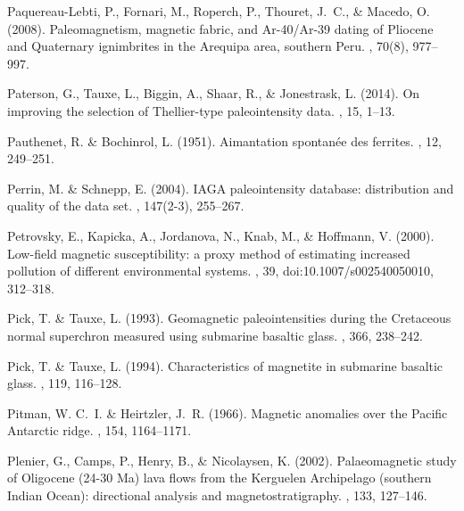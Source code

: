 Paquereau-Lebti, P., Fornari, M., Roperch, P., Thouret, J.~C., \& Macedo, O.
  (2008).
\newblock Paleomagnetism, magnetic fabric, and Ar-40/Ar-39 dating of Pliocene
  and Quaternary ignimbrites in the Arequipa area, southern Peru.
, 70(8), 977--997.

Paterson, G., Tauxe, L., Biggin, A., Shaar, R., \& Jonestrask, L. (2014).
\newblock On improving the selection of Thellier-type paleointensity data.
, 15, 1--13.

Pauthenet, R. \& Bochinrol, L. (1951).
\newblock Aimantation spontan\'ee des ferrites.
, 12, 249--251.

Perrin, M. \& Schnepp, E. (2004).
\newblock IAGA paleointensity database: distribution and quality of the data
  set.
, 147(2-3), 255--267.

Petrovsky, E., Kapicka, A., Jordanova, N., Knab, M., \& Hoffmann, V. (2000).
\newblock Low-field magnetic susceptibility: a proxy method of estimating
  increased pollution of different environmental systems.
, 39, doi:10.1007/s002540050010, 312--318.

Pick, T. \& Tauxe, L. (1993).
\newblock Geomagnetic paleointensities during the Cretaceous normal superchron
  measured using submarine basaltic glass.
, 366, 238--242.

Pick, T. \& Tauxe, L. (1994).
\newblock Characteristics of magnetite in submarine basaltic glass.
, 119, 116--128.

Pitman, W. C.~I. \& Heirtzler, J.~R. (1966).
\newblock Magnetic anomalies over the Pacific Antarctic ridge.
, 154, 1164--1171.

Plenier, G., Camps, P., Henry, B., \& Nicolaysen, K. (2002).
\newblock Palaeomagnetic study of Oligocene (24-30 Ma) lava flows from the
  Kerguelen Archipelago (southern Indian Ocean): directional analysis and
  magnetostratigraphy.
, 133, 127--146.

